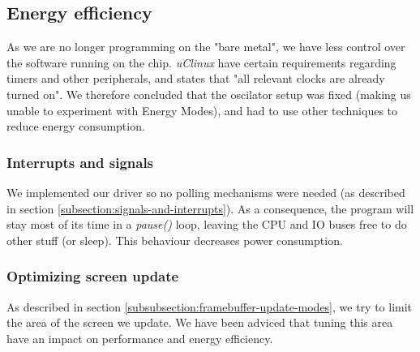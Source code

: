 \subsection{Energy efficiency}
\label{subsection:energy-efficiency}
As we are no longer programming on the "bare metal", we have less control over the software running on the chip. \emph{uClinux} have certain requirements regarding timers and other peripherals, and \cite{compendium} states that "all relevant clocks are already turned on". We therefore concluded that the oscilator setup was fixed (making us unable to experiment with Energy Modes), and had to use other techniques to reduce energy consumption.

\subsubsection{Interrupts and signals}
We implemented our driver so no polling mechanisms were needed (as described in section \ref{subsection:signals-and-interrupts}). As a consequence, the program will stay most of its time in a \emph{pause()} loop, leaving the CPU and IO buses free to do other stuff (or  sleep). This behaviour decreases power consumption.

\subsubsection{Optimizing screen update}
As described in section \ref{subsubsection:framebuffer-update-modes}, we try to limit the area of the screen we update. We have been adviced that tuning this area have an impact on performance and energy efficiency.

